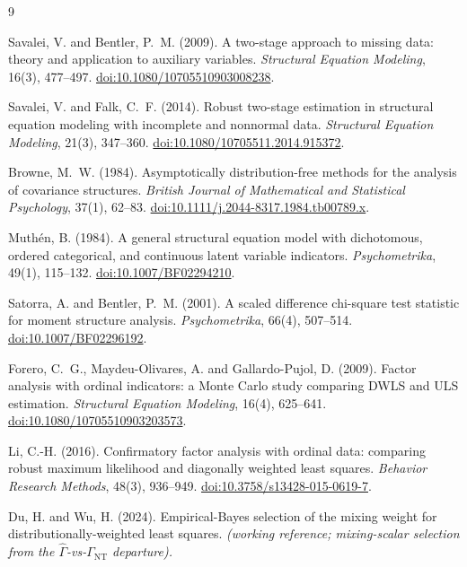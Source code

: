 \documentclass[11pt]{article}
\newcommand{\Gnt}{\Gamma_{\mathrm{NT}}}
\theoremstyle{plain}
\theoremstyle{remark}
\begin{document}
\begin{thebibliography}{9}

 Savalei, V. and Bentler, P.~M. (2009). A two-stage
approach to missing data: theory and application to auxiliary variables.
\emph{Structural Equation Modeling}, 16(3), 477--497.
\href{https://doi.org/10.1080/10705510903008238}{doi:10.1080/10705510903008238}.

 Savalei, V. and Falk, C.~F. (2014). Robust two-stage
estimation in structural equation modeling with incomplete and nonnormal data.
\emph{Structural Equation Modeling}, 21(3), 347--360.
\href{https://doi.org/10.1080/10705511.2014.915372}{doi:10.1080/10705511.2014.915372}.

 Browne, M.~W. (1984). Asymptotically distribution-free
methods for the analysis of covariance structures. \emph{British Journal of
Mathematical and Statistical Psychology}, 37(1), 62--83.
\href{https://doi.org/10.1111/j.2044-8317.1984.tb00789.x}{doi:10.1111/j.2044-8317.1984.tb00789.x}.

 Muth\'en, B. (1984). A general structural equation model
with dichotomous, ordered categorical, and continuous latent variable
indicators. \emph{Psychometrika}, 49(1), 115--132.
\href{https://doi.org/10.1007/BF02294210}{doi:10.1007/BF02294210}.

 Satorra, A. and Bentler, P.~M. (2001). A scaled
difference chi-square test statistic for moment structure analysis.
\emph{Psychometrika}, 66(4), 507--514.
\href{https://doi.org/10.1007/BF02296192}{doi:10.1007/BF02296192}.

 Forero, C.~G., Maydeu-Olivares, A. and Gallardo-Pujol, D.
(2009). Factor analysis with ordinal indicators: a Monte Carlo study comparing
DWLS and ULS estimation. \emph{Structural Equation Modeling}, 16(4), 625--641.
\href{https://doi.org/10.1080/10705510903203573}{doi:10.1080/10705510903203573}.

 Li, C.-H. (2016). Confirmatory factor analysis with ordinal
data: comparing robust maximum likelihood and diagonally weighted least squares.
\emph{Behavior Research Methods}, 48(3), 936--949.
\href{https://doi.org/10.3758/s13428-015-0619-7}{doi:10.3758/s13428-015-0619-7}.

 Du, H. and Wu, H. (2024). Empirical-Bayes selection of the
mixing weight for distributionally-weighted least squares.
\emph{(working reference; mixing-scalar selection from the $\hat\Gamma$-vs-$\Gnt$
departure).}

\end{thebibliography}
\end{document}
